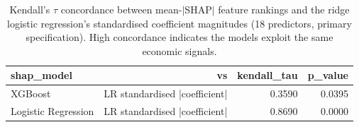 \begin{table}[htbp]
\centering
\caption{Kendall's $\tau$ concordance between mean-$|$SHAP$|$ feature rankings and the ridge logistic regression's standardised coefficient magnitudes (18 predictors, primary specification). High concordance indicates the models exploit the same economic signals.}
\label{tab:v2_shap_lr_concordance}
\small
\begin{tabular}{lrrr}
\toprule
shap\_model & vs & kendall\_tau & p\_value \\
\midrule
XGBoost & LR standardised |coefficient| & 0.3590 & 0.0395 \\
Logistic Regression & LR standardised |coefficient| & 0.8690 & 0.0000 \\
\bottomrule
\end{tabular}
\end{table}
